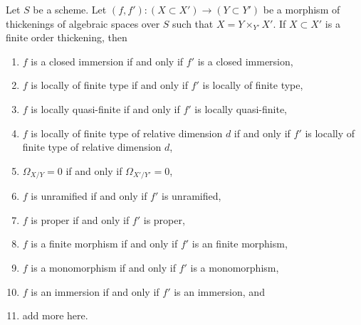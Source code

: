 \begin{lemma}
\label{lemma-thicken-property-morphisms-cartesian}
Let $S$ be a scheme. Let $(f, f') : (X \subset X') \to (Y \subset Y')$ be a
morphism of thickenings of algebraic spaces over $S$ such that
$X = Y \times_{Y'} X'$. If $X \subset X'$ is a finite order thickening, then
\begin{enumerate}
\item $f$ is a closed immersion if and only if $f'$ is a closed immersion,
\item $f$ is locally of finite type if and only if $f'$ is
locally of finite type,
\item $f$ is locally quasi-finite if and only if $f'$ is locally
quasi-finite,
\item $f$ is locally of finite type of relative dimension $d$ if and
only if $f'$ is locally of finite type of relative dimension $d$,
\item $\Omega_{X/Y} = 0$ if and only if $\Omega_{X'/Y'} = 0$,
\item $f$ is unramified if and only if $f'$ is unramified,
\item $f$ is proper if and only if $f'$ is proper,
\item $f$ is a finite morphism if and only if $f'$ is an finite morphism,
\item $f$ is a monomorphism if and only if $f'$ is a monomorphism,
\item $f$ is an immersion if and only if $f'$ is an immersion, and
\item add more here.
\end{enumerate}
\end{lemma}

